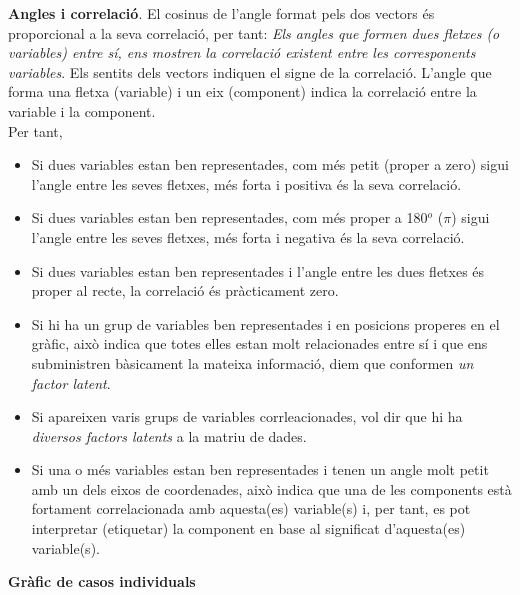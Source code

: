 \documentclass[english]{article}
\begin{document}
\textbf{Angles i correlació}. El cosinus de l'angle format pels dos vectors és proporcional a la seva correlació, per tant: \textit{Els angles que formen dues fletxes (o variables) entre sí, ens mostren la correlació existent entre les corresponents variables}. Els sentits dels vectors indiquen el signe de la correlació. L'angle que forma una fletxa (variable) i un eix (component) indica la correlació entre la variable i la component.\\

Per tant,\\
\begin{itemize}
\item Si dues variables estan ben representades, com més petit (proper a zero) sigui l'angle entre les seves fletxes, més forta i positiva és la seva correlació.

\item Si dues variables estan ben representades, com més  proper a 180$^o$ ($\pi$) sigui l'angle entre les seves fletxes, més forta i negativa és la seva correlació.

\item Si dues variables estan ben representades i l'angle entre les dues fletxes és proper al recte, la correlació és pràcticament zero.

\item Si hi ha un grup de variables ben representades i en posicions properes en el gràfic, això indica que totes elles estan molt relacionades entre sí i que ens subministren bàsicament la mateixa informació, diem que conformen \textit{un factor latent}.

\item Si apareixen varis grups de variables corrleacionades, vol dir que hi ha \textit{diversos factors latents} a la matriu de dades.

\item Si una o més  variables estan ben representades i tenen un angle molt petit amb un dels eixos de coordenades, això indica que una de les components  està fortament correlacionada amb aquesta(es) variable(s) i, per tant, es pot interpretar (etiquetar) la component en base al significat d'aquesta(es) variable(s).
\end{itemize}

\noindent\textbf{Gràfic de casos individuals}\\
\end{document}
